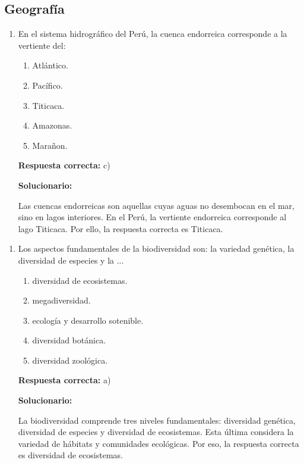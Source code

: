 \subsection*{Geografía}

\begin{enumerate}
	
	\item En el sistema hidrográfico del Perú, la cuenca endorreica corresponde a la vertiente del:
	
	
	\begin{enumerate}[label=\alph*)]
		\item Atlántico.
		\item Pacífico.
		\item Titicaca.
		\item Amazonas.
		\item Marañon.
	\end{enumerate}
	
	\textbf{Respuesta correcta:} c)
	
	\vspace{2mm}
	\textbf{Solucionario:}
	
	Las cuencas endorreicas son aquellas cuyas aguas no desembocan en el mar, sino en lagos interiores. En el Perú, la vertiente endorreica corresponde al lago Titicaca. Por ello, la respuesta correcta es Titicaca.
	
\end{enumerate}

\begin{enumerate}[resume]
	
	\item Los aspectos fundamentales de la biodiversidad son: la variedad genética, la diversidad de especies y la ...
	
	\begin{enumerate}[label=\alph*)]
		\item diversidad de ecosistemas.
		\item megadiversidad.
		\item ecología y desarrollo sotenible.
		\item diversidad botánica.
		\item diversidad zoológica.
	\end{enumerate}
	
	\textbf{Respuesta correcta:} a)
	
	\vspace{2mm}
	\textbf{Solucionario:}
	
	La biodiversidad comprende tres niveles fundamentales: diversidad genética, diversidad de especies y diversidad de ecosistemas. Esta última considera la variedad de hábitats y comunidades ecológicas. Por eso, la respuesta correcta es diversidad de ecosistemas.
	
\end{enumerate}



